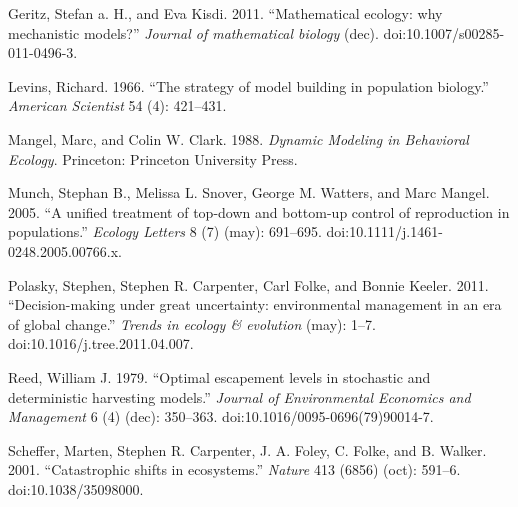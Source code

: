\documentclass[author-year, review]{elsarticle} %
\begin{document}
Geritz, Stefan a. H., and Eva Kisdi. 2011. ``Mathematical ecology: why
mechanistic models?'' \emph{Journal of mathematical biology} (dec).
doi:10.1007/s00285-011-0496-3.

Levins, Richard. 1966. ``The strategy of model building in population
biology.'' \emph{American Scientist} 54 (4): 421--431.

Mangel, Marc, and Colin W. Clark. 1988. \emph{Dynamic Modeling in
Behavioral Ecology}. Princeton: Princeton University Press.

Munch, Stephan B., Melissa L. Snover, George M. Watters, and Marc
Mangel. 2005. ``A unified treatment of top-down and bottom-up control of
reproduction in populations.'' \emph{Ecology Letters} 8 (7) (may):
691--695. doi:10.1111/j.1461-0248.2005.00766.x.

Polasky, Stephen, Stephen R. Carpenter, Carl Folke, and Bonnie Keeler.
2011. ``Decision-making under great uncertainty: environmental
management in an era of global change.'' \emph{Trends in ecology \&
evolution} (may): 1--7. doi:10.1016/j.tree.2011.04.007.

Reed, William J. 1979. ``Optimal escapement levels in stochastic and
deterministic harvesting models.'' \emph{Journal of Environmental
Economics and Management} 6 (4) (dec): 350--363.
doi:10.1016/0095-0696(79)90014-7.

Scheffer, Marten, Stephen R. Carpenter, J. A. Foley, C. Folke, and B.
Walker. 2001. ``Catastrophic shifts in ecosystems.'' \emph{Nature} 413
(6856) (oct): 591--6. doi:10.1038/35098000.
\end{document}
